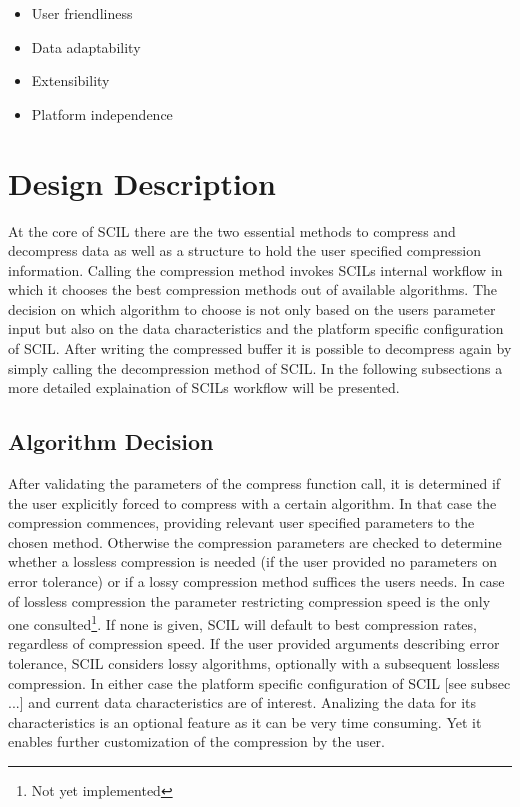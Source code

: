 \documentclass[
	12pt,
	a4paper,
	BCOR10mm,
	DIV14,
	headsepline,
]{scrreprt}
\begin{document}
\bigskip

\begin{itemize}
	\item User friendliness
	\item Data adaptability
	\item Extensibility
	\item Platform independence
\end{itemize}

\bigskip

\clearpage

\section{Design Description}

\bigskip

At the core of SCIL there are the two essential methods to compress and
decompress data as well as a structure to hold the user specified compression
information. Calling the compression method invokes SCILs internal workflow in
which it chooses the best compression methods out of available algorithms.
The decision on which algorithm to choose is not only based on the users
parameter input but also on the data characteristics and the platform specific
configuration of SCIL. After writing the compressed buffer it is possible to
decompress again by simply calling the decompression method of SCIL.
In the following subsections a more detailed explaination of SCILs workflow
will be presented.

\bigskip

\subsection{Algorithm Decision}

\bigskip

After validating the parameters of the compress function call, it is determined
if the user explicitly forced to compress with a certain algorithm. In that case
the compression commences, providing relevant user specified parameters to the
chosen method. Otherwise the compression parameters are checked to determine
whether a lossless compression is needed (if the user provided no parameters on
error tolerance) or if a lossy compression method suffices the users needs. In
case of lossless compression the parameter restricting compression speed is
the only one consulted\footnote{Not yet implemented}. If none is given, SCIL
will default to best compression rates, regardless of compression speed. If the
user provided arguments describing error tolerance, SCIL considers lossy
algorithms, optionally with a subsequent lossless
compression\footnotemark[\value{footnote}]. In either case the platform specific
configuration of SCIL [see subsec ...] and current data characteristics are of
interest. Analizing the data for its characteristics is an optional feature as
it can be very time consuming. Yet it enables further customization of the
compression by the user.
\end{document}
